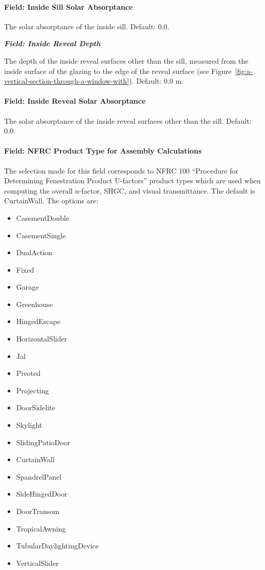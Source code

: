 \paragraph{Field: Inside Sill Solar Absorptance}\label{field-inside-sill-solar-absorptance}

The solar absorptance of the inside sill. Default: 0.0.

\textbf{\emph{Field: Inside Reveal Depth}}

The depth of the inside reveal surfaces other than the sill, measured from the inside surface of the glazing to the edge of the reveal surface (see Figure~\ref{fig:a-vertical-section-through-a-window-with}). Default: 0.0 m.

\paragraph{Field: Inside Reveal Solar Absorptance}\label{field-inside-reveal-solar-absorptance}

The solar absorptance of the inside reveal surfaces other than the sill. Default: 0.0.

\paragraph{Field: NFRC Product Type for Assembly Calculations}\label{field-nfrc-product-type-for-assembly-calculations}

The selection made for this field corresponds to NFRC 100 ``Procedure for Determining Fenestration Product U-factors'' product types which are used when computing the overall u-factor, SHGC, and visual transmittance. The default is CurtainWall. The options are:

\begin{itemize}
\item
  CasementDouble
\item
  CasementSingle
\item
  DualAction
\item
  Fixed
\item
  Garage
\item
  Greenhouse
\item
  HingedEscape
\item
  HorizontalSlider
\item
  Jal
\item
  Pivoted
\item
  Projecting
\item
  DoorSidelite
\item
  Skylight
\item
  SlidingPatioDoor
\item
  CurtainWall
\item
  SpandrelPanel
\item
  SideHingedDoor
\item
  DoorTransom
\item
  TropicalAwning
\item
  TubularDaylightingDevice
\item
  VerticalSlider
\end{itemize}

